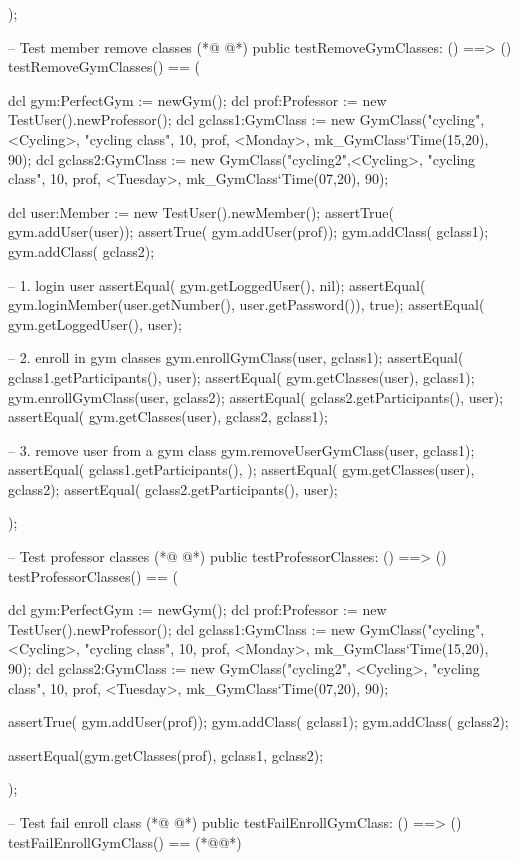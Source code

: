 \begin{vdmpp}[breaklines=true]
 );
 
 -- Test member remove classes
(*@
\label{testRemoveGymClasses:290}
@*)
 public testRemoveGymClasses: () ==> ()
 testRemoveGymClasses() == (
 
   dcl gym:PerfectGym := newGym();
  dcl prof:Professor := new TestUser().newProfessor();
  dcl gclass1:GymClass := new GymClass("cycling", <Cycling>, "cycling class", 10, prof, <Monday>, mk_GymClass`Time(15,20), 90);
  dcl gclass2:GymClass := new GymClass("cycling2",<Cycling>, "cycling class", 10, prof, <Tuesday>, mk_GymClass`Time(07,20), 90);
  
  dcl user:Member := new TestUser().newMember(); 
  assertTrue( gym.addUser(user));
  assertTrue( gym.addUser(prof));
  gym.addClass( gclass1); 
  gym.addClass( gclass2);
  
  
  -- 1. login user
  assertEqual( gym.getLoggedUser(), nil); 
  assertEqual( gym.loginMember(user.getNumber(), user.getPassword()), true);
  assertEqual( gym.getLoggedUser(), user);
  
  -- 2. enroll in gym classes
  gym.enrollGymClass(user, gclass1);
  assertEqual( gclass1.getParticipants(), {user});
  assertEqual( gym.getClasses(user), {gclass1});
  gym.enrollGymClass(user, gclass2);
  assertEqual( gclass2.getParticipants(), {user});
  assertEqual( gym.getClasses(user), {gclass2, gclass1});
 
   -- 3. remove user from a gym class
   gym.removeUserGymClass(user, gclass1);
   assertEqual( gclass1.getParticipants(), {});
   assertEqual( gym.getClasses(user), {gclass2});
   assertEqual( gclass2.getParticipants(), {user});
   
 );
 
 -- Test professor classes
(*@
\label{testProfessorClasses:327}
@*)
 public testProfessorClasses: () ==> ()
 testProfessorClasses() == (
 
   dcl gym:PerfectGym := newGym();
  dcl prof:Professor := new TestUser().newProfessor();
  dcl gclass1:GymClass := new GymClass("cycling", <Cycling>, "cycling class", 10, prof, <Monday>, mk_GymClass`Time(15,20), 90);
  dcl gclass2:GymClass := new GymClass("cycling2", <Cycling>, "cycling class", 10, prof, <Tuesday>, mk_GymClass`Time(07,20), 90);
 
  assertTrue( gym.addUser(prof));
  gym.addClass( gclass1); 
  gym.addClass( gclass2);
  
  assertEqual(gym.getClasses(prof), {gclass1, gclass2});
  
 );
 
 -- Test fail enroll class
(*@
\label{testFailEnrollGymClass:344}
@*)
 public testFailEnrollGymClass: () ==> ()
 testFailEnrollGymClass() == (*@\vdmnotcovered{(}@*)
  

\end{vdmpp}
